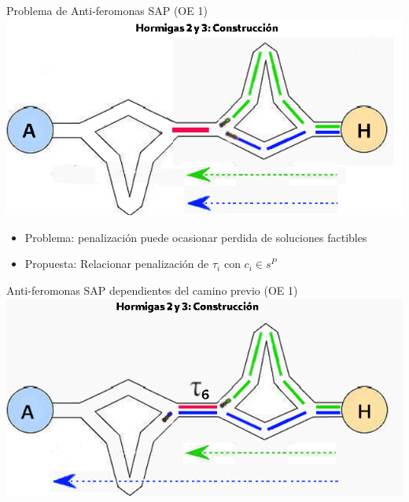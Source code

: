 \begin{frame}{Problema de Anti-feromonas SAP (OE 1)}
\centering
\includegraphics[scale=0.4]{Pictures/ACO-ant-constr-penalize.png}
    \begin{itemize}
        \item Problema: penalizaci\'on puede ocasionar perdida de soluciones factibles
        \item Propuesta: Relacionar penalizaci\'on de $\tau_i$ con $c_i \in s^P$
    \end{itemize}
\end{frame}

\begin{frame}{Anti-feromonas SAP dependientes del camino previo (OE 1)}
    \centering
    \includegraphics[scale=0.51]{Pictures/ACO-ant-ferom-penalize-seg.png}
\end{frame}



